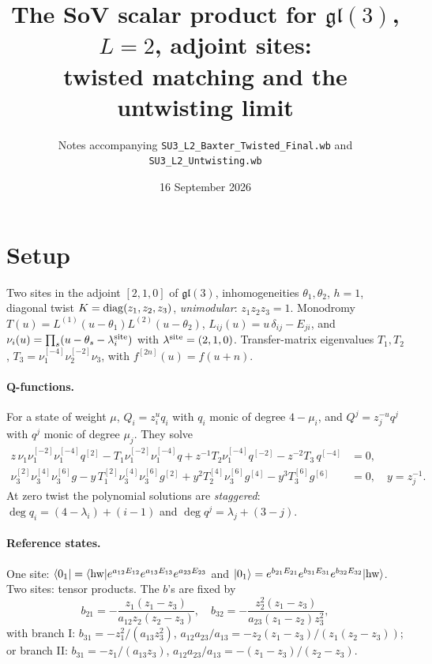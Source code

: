 \documentclass[11pt]{article}
\title{The SoV scalar product for $\mathfrak{gl}(3)$, $L=2$, adjoint sites:\\
twisted matching and the untwisting limit}
\author{Notes accompanying \texttt{SU3\_L2\_Baxter\_Twisted\_Final.wb} and \texttt{SU3\_L2\_Untwisting.wb}}
\date{16 September 2026}
\begin{document}
\maketitle
\tableofcontents

\section{Setup}

Two sites in the adjoint $[2,1,0]$ of $\mathfrak{gl}(3)$, inhomogeneities $\theta_1,\theta_2$, $h=1$,
diagonal twist $K={\rm diag}(z_1,z_2,z_3)$, \emph{unimodular}: $z_1z_2z_3=1$. Monodromy
$T(u)=L^{(1)}(u-\theta_1)L^{(2)}(u-\theta_2)$, $L_{ij}(u)=u\,\delta_{ij}-E_{ji}$, and
$\nu_i(u)=\prod_s(u-\theta_s-\lambda^{\rm site}_i)$ with $\lambda^{\rm site}=(2,1,0)$.
Transfer-matrix eigenvalues $T_1,T_2$, $T_3=\nu_1^{[-4]}\nu_2^{[-2]}\nu_3$, with $f^{[2n]}(u)=f(u+n)$.

\paragraph{Q-functions.} For a state of weight $\mu$,
$Q_i=z_i^{u}q_i$ with $q_i$ monic of degree $4-\mu_i$, and $Q^j=z_j^{-u}q^j$ with $q^j$ monic of degree $\mu_j$. They solve
\begin{align}
z\,\nu_1\nu_1^{[-2]}\nu_1^{[-4]}q^{[2]}-T_1\nu_1^{[-2]}\nu_1^{[-4]}q+z^{-1}T_2\nu_1^{[-4]}q^{[-2]}-z^{-2}T_3\,q^{[-4]}&=0,\\
\nu_3^{[2]}\nu_3^{[4]}\nu_3^{[6]}g-y\,T_1^{[2]}\nu_3^{[4]}\nu_3^{[6]}g^{[2]}+y^2T_2^{[4]}\nu_3^{[6]}g^{[4]}-y^3T_3^{[6]}g^{[6]}&=0,\quad y=z_j^{-1}.
\end{align}
At zero twist the polynomial solutions are \emph{staggered}: $\deg q_i=(4-\lambda_i)+(i-1)$ and $\deg q^j=\lambda_j+(3-j)$.

\paragraph{Reference states.} One site: $\langle0_1|=\langle{\rm hw}|e^{a_{12}E_{12}}e^{a_{13}E_{13}}e^{a_{23}E_{23}}$ and
$|0_1\rangle=e^{b_{21}E_{21}}e^{b_{31}E_{31}}e^{b_{32}E_{32}}|{\rm hw}\rangle$. Two sites: tensor products. The $b$'s are fixed by
\begin{equation}
b_{21}=-\frac{z_1(z_1-z_3)}{a_{12}z_2(z_2-z_3)},\quad b_{32}=-\frac{z_2^2(z_1-z_3)}{a_{23}(z_1-z_2)z_3^2},
\end{equation}
with branch I: $b_{31}=-z_1^2/(a_{13}z_3^2)$, $a_{12}a_{23}/a_{13}=-z_2(z_1-z_3)/(z_1(z_2-z_3))$;
or branch II: $b_{31}=-z_1/(a_{13}z_3)$, $a_{12}a_{23}/a_{13}=-(z_1-z_3)/(z_2-z_3)$.
\end{document}
